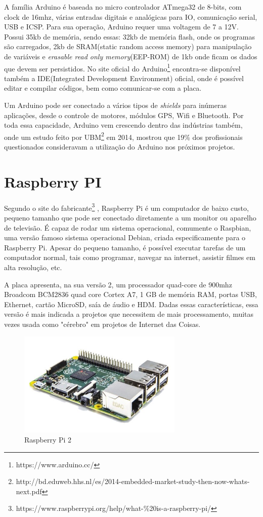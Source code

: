 A família Arduino é baseada no micro controlador ATmega32 de 8-bits, com clock de 16mhz, várias entradas digitais e analógicas para IO, comunicação serial, USB e ICSP. Para sua operação, Arduino requer uma voltagem de 7 a 12V. Possui 35kb de memória, sendo essas: 32kb de memória flash, onde os programas são carregados, 2kb de SRAM(static random access memory) para manipulação de variáveis e \textit{erasable read only memory}(EEP-ROM) de 1kb  onde ficam os dados que devem ser persistidos. No site oficial do Arduino\footnote{https://www.arduino.cc/} encontra-se disponível também a IDE(Integrated Development Environment) oficial, onde é possível editar e compilar códigos, bem como comunicar-se com a placa.

Um Arduino pode ser conectado a vários tipos de \textit{shields} para inúmeras aplicações, desde o controle de motores, módulos GPS, Wifi e Bluetooth. Por toda essa capacidade, Arduino vem crescendo dentro das indústrias também, onde um estudo feito por UBM\footnote{http://bd.eduweb.hhs.nl/es/2014-embedded-market-study-then-now-whats-next.pdf} em 2014, mostrou que 19\% dos profissionais questionados consideravam a utilização do Arduino nos próximos projetos.
\section{Raspberry PI}

Segundo o site do fabricante\footnote{https://www.raspberrypi.org/help/what-\%20is-a-raspberry-pi/} , Raspberry Pi é um computador de baixo custo, pequeno tamanho que pode ser conectado diretamente a um monitor ou aparelho de televisão. É capaz de rodar um sistema operacional, comumente o Raspbian, uma versão famoso sistema operacional Debian, criada especificamente para o Raspberry Pi. Apesar do pequeno tamanho, é possível executar tarefas de um computador normal, tais como programar, navegar na internet, assistir filmes em alta resolução, etc. 

A placa apresenta, na sua versão 2, um processador quad-core de 900mhz  Broadcom BCM2836 quad core Cortex A7, 1 GB de memória RAM, portas USB, Ethernet, cartão MicroSD, saía de áudio e HDM. Dadas essas características, essa versão é mais indicada a projetos que necessitem de mais processamento, muitas vezes usada como "cérebro" em projetos de Internet das Coisas.

\begin{figure}[H]
    \centering
    \includegraphics[width=0.7\textwidth]{figuras/raspberrypi2.jpg}
    \caption{Raspberry Pi 2}
    \label{fig:raspberry-pi}
\end{figure}

